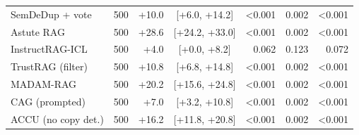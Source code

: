 \begin{table}[h]
\begin{tabular}{l r r c r r r}
SemDeDup + vote & 500 & +10.0 & [+6.0, +14.2] & <0.001 & 0.002 & <0.001 \\
Astute RAG & 500 & +28.6 & [+24.2, +33.0] & <0.001 & 0.002 & <0.001 \\
InstructRAG-ICL & 500 & +4.0 & [+0.0, +8.2] & 0.062 & 0.123 & 0.072 \\
TrustRAG (filter) & 500 & +10.8 & [+6.8, +14.8] & <0.001 & 0.002 & <0.001 \\
MADAM-RAG & 500 & +20.2 & [+15.6, +24.8] & <0.001 & 0.002 & <0.001 \\
CAG (prompted) & 500 & +7.0 & [+3.2, +10.8] & <0.001 & 0.002 & <0.001 \\
ACCU (no copy det.) & 500 & +16.2 & [+11.8, +20.8] & <0.001 & 0.002 & <0.001 \\
\bottomrule
\end{tabular}
\end{table}
